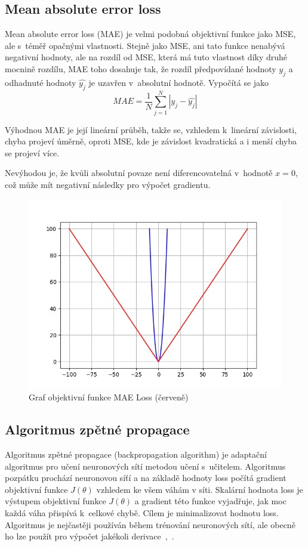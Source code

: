 \subsection*{Mean absolute error loss}
Mean absolute error loss (MAE) je velmi podobná objektivní funkce jako MSE, ale s~téměř opačnými vlastnosti. Stejně jako MSE, ani tato funkce nenabývá negativní hodnoty, ale na rozdíl od MSE, která má tuto vlastnost díky druhé mocnině rozdílu, MAE toho dosahuje tak, že rozdíl předpovídané hodnoty $y_j$ a odhadnuté hodnoty $\hat{y_j}$ je uzavřen v~absolutní hodnotě. Vypočítá se jako
\begin{equation}
  MAE = \frac{1}{N}\sum_{j=1}^N|y_j - \hat{y_j}|
\end{equation}

Výhodnou MAE je její lineární průběh, takže se, vzhledem k~lineární závislosti, chyba projeví úměrně, oproti MSE, kde je závislost kvadratická a i menší chyba se projeví více.

Nevýhodou je, že kvůli absolutní povaze není diferencovatelná v~hodnotě $x=0$, což může mít negativní následky pro výpočet gradientu.

\begin{figure}[H]
    \centering
    \includegraphics[scale=0.4]{obrazky-figures/maeloss.png}
    \caption{\label{fig:maeloss}Graf objektivní funkce MAE Loss (červeně)}
\end{figure}


\subsection{Algoritmus zpětné propagace}
Algoritmus zpětné propagace (backpropagation algorithm) je adaptační algoritmus pro učení neuronových sítí metodou učení s~učitelem. Algoritmus pozpátku prochází neuronovou síťí a na základě hodnoty loss počítá gradient objektivní funkce $J(\theta)$ vzhledem ke všem váhám v síti. Skalární hodnota loss je výstupem objektivní funkce $J(\theta)$ a gradient této funkce vyjadřuje, jak moc každá váha přispívá k~celkové chybě. Cílem je minimalizovat hodnotu loss. Algoritmus je nejčastěji používán během trénování neuronových sítí, ale obecně ho lze použít pro výpočet jakékoli derivace~\cite{mitdeeplearning_small},~\cite{mitdeeplearning}.

